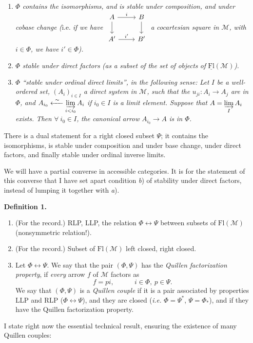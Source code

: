 \documentclass[11pt]{article}
\newcommand{\msp}[1]{\marginpar{\footnotesize [#1]}}
\newcommand{\Fl}{\mathrm{Fl}}
\newcommand{\M}{\mathcal{M}}
\begin{document}
\begin{enumerate}[label={}]
\item[a)] \textit{$\Phi$ contains the isomorphisms, and is stable under composition, and under cobase change (}i.e. \textit{if we have}
$\vcenter{\hbox{\begin{tikzcd}
A \arrow[r, "i"] \arrow[d] & B \arrow[d] \\
A' \arrow[r, "i'"] & B'
\end{tikzcd}}}$
\textit{a cocartesian square in $\M$, with $i \in \Phi$, we have $i' \in \Phi$).}

\item[b)] \textit{$\Phi$ stable under direct factors (as a subset of the set of objects of} $\underline{\Fl}(\M)$\textit{).}

\item[c)] \textit{$\Phi$ ``stable under ordinal direct limits'', in the following sense: Let $I$ be a well-ordered set, $(A_i)_{i \in I}$ a direct system in $\M$, such that the $u_{ji} : A_i \longrightarrow A_j$ are in $\Phi$, and $A_{i_0} \xleftarrow{\ \sim\ } \varinjlim\limits_{i<i_0} A_i$ if $i_0 \in I$ is a limit element. Suppose that $A = \varinjlim\limits_{I} A_i$ exists. Then $\forall\ i_0 \in I$, the canonical arrow $A_{i_0} \longrightarrow A$ is in $\Phi$.}
\end{enumerate}

There is a dual statement for a right closed subset $\Psi$; it contains the isomorphisms, is stable under composition and under base change, under direct factors, and finally stable under ordinal inverse limits.

\msp{page 5}

We will have a partial converse in accessible categories. It is for the statement of this converse that I have set apart condition \textit{b}) of stability under direct factors, instead of lumping it together with \textit{a}).

\noindent\textbf{Definition 1.}

\begin{enumerate}[label={}]
\item[\textit{a})] (For the record.) RLP, LLP, the relation $\Phi \longleftrightarrow \Psi$ between subsets of $\Fl(\M)$ (nonsymmetric relation!).

\item[\textit{b})] (For the record.) Subset of $\Fl(\M)$ left closed, right closed.

\item[\textit{c})] Let $\Phi \longleftrightarrow \Psi$. We say that the pair $(\Phi, \Psi)$ has the \textit{Quillen factorization property}, if \textit{every} arrow $f$ of $\M$ factors as
\[
f = pi, \qquad\quad i \in \Phi,\ p \in \Psi.
\]
We say that $(\Phi, \Psi)$ is a \textit{Quillen couple} if it is a pair associated by properties LLP and RLP ($\Phi \longleftrightarrow \Psi$), and they are closed (\textit{i.e.} $\Phi = \Psi^*$, $\Psi = \Phi_*$), and if they have the Quillen factorization property.
\end{enumerate}

I state right now the essential technical result, ensuring the existence of many Quillen couples:
\end{document}
